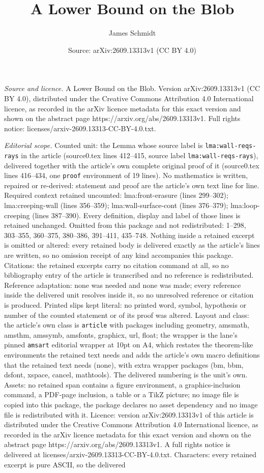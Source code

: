 \documentclass[10pt,a4paper]{amsart}
\title[A Lower Bound on the Blob]{A Lower Bound on the Blob}
\author{James Schmidt}
\date{Source: arXiv:2609.13313v1 (CC BY 4.0)}
\begin{document}
\maketitle

\noindent\emph{Source and licence.} A Lower Bound on the Blob. Version arXiv:2609.13313v1 (CC BY 4.0), distributed under the Creative Commons Attribution 4.0 International licence, as recorded in the arXiv licence metadata for this exact version and shown on the abstract page https://arxiv.org/abs/2609.13313v1. Full rights notice: licenses/arxiv-2609.13313-CC-BY-4.0.txt.\par\smallskip

\noindent\textit{Editorial scope.} Counted unit: the Lemma whose source label is \texttt{lma:wall-reqs-rays} in the article (source0.tex lines 412--415, source label \texttt{lma:wall-reqs-rays}), delivered together with the article's own complete original proof of it (source0.tex lines 416--434, one \texttt{proof} environment of 19 lines). No mathematics is written, repaired or re-derived: statement and proof are the article's own text line for line. Required context retained uncounted: lma:front-erasure (lines 299--302); lma:creeping-wall (lines 356--359); lma:wall-surface-cont (lines 376--379); lma:loop-creeping (lines 387--390). Every definition, display and label of those lines is retained unchanged. Omitted from this package and not redistributed: 1--298, 303--355, 360--375, 380--386, 391--411, 435--748. Nothing inside a retained excerpt is omitted or altered: every retained body is delivered exactly as the article's lines are written, so no omission receipt of any kind accompanies this package. Citations: the retained excerpts carry no citation command at all, so no bibliography entry of the article is transcribed and no reference is redistributed. Reference adaptation: none was needed and none was made; every reference inside the delivered unit resolves inside it, so no unresolved reference or citation is produced. Printed slips kept literal: no printed word, symbol, hypothesis or number of the counted statement or of its proof was altered. Layout and class: the article's own class is \texttt{article} with packages including geometry, amsmath, amsthm, amssymb, amsfonts, graphicx, url, float; the wrapper is the lane's pinned \texttt{amsart} editorial wrapper at 10pt on A4, which restates the theorem-like environments the retained text needs and adds the article's own macro definitions that the retained text needs (none), with extra wrapper packages (bm, bbm, dsfont, xspace, cancel, mathtools). The delivered numbering is the unit's own. Assets: no retained span contains a figure environment, a graphics-inclusion command, a PDF-page inclusion, a table or a TikZ picture; no image file is copied into this package, the package declares no asset dependency and no image file is redistributed with it. Licence: version arXiv:2609.13313v1 of this article is distributed under the Creative Commons Attribution 4.0 International licence, as recorded in the arXiv licence metadata for this exact version and shown on the abstract page https://arxiv.org/abs/2609.13313v1. A full rights notice is delivered at licenses/arxiv-2609.13313-CC-BY-4.0.txt. Characters: every retained excerpt is pure ASCII, so the delivered 
\end{document}

